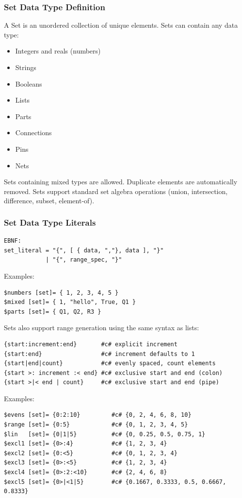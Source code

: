 \subsubsection{Set Data Type Definition}
A Set is an unordered collection of unique elements. Sets can contain any data type:
\begin{itemize}
\item Integers and reals (numbers)
\item Strings
\item Booleans
\item Lists
\item Parts
\item Connections
\item Pins
\item Nets
\end{itemize}

Sets containing mixed types are allowed. Duplicate elements are automatically removed. Sets support standard set algebra operations (union, intersection, difference, subset, element-of).

\subsubsection{Set Data Type Literals}
\begin{verbatim}
EBNF:
set_literal = "{", [ { data, ","}, data ], "}"
            | "{", range_spec, "}"
\end{verbatim}

Examples:
\begin{verbatim}
$numbers [set]= { 1, 2, 3, 4, 5 }
$mixed [set]= { 1, "hello", True, Q1 }
$parts [set]= { Q1, Q2, R3 }
\end{verbatim}

Sets also support range generation using the same syntax as lists:
\begin{verbatim}
{start:increment:end}       #c# explicit increment
{start:end}                 #c# increment defaults to 1
{start|end|count}           #c# evenly spaced, count elements
{start >: increment :< end} #c# exclusive start and end (colon)
{start >|< end | count}     #c# exclusive start and end (pipe)
\end{verbatim}
Examples:
\begin{verbatim}
$evens [set]= {0:2:10}         #c# {0, 2, 4, 6, 8, 10}
$range [set]= {0:5}            #c# {0, 1, 2, 3, 4, 5}
$lin   [set]= {0|1|5}          #c# {0, 0.25, 0.5, 0.75, 1}
$excl1 [set]= {0>:4}           #c# {1, 2, 3, 4}
$excl2 [set]= {0:<5}           #c# {0, 1, 2, 3, 4}
$excl3 [set]= {0>:<5}          #c# {1, 2, 3, 4}
$excl4 [set]= {0>:2:<10}       #c# {2, 4, 6, 8}
$excl5 [set]= {0>|<1|5}        #c# {0.1667, 0.3333, 0.5, 0.6667, 0.8333}
\end{verbatim}

